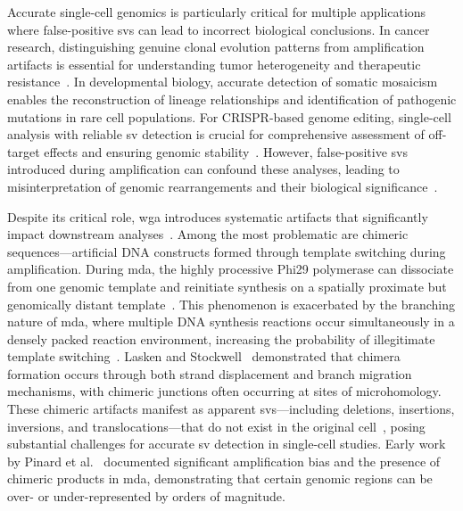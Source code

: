 \documentclass[pdflatex,sn-nature,lineno]{sn-jnl}%
\theoremstyle{thmstyleone}%
\theoremstyle{thmstyletwo}%
\theoremstyle{thmstylethree}%
\begin{document}
Accurate single-cell genomics is particularly critical for multiple applications where false-positive \glspl{sv} can lead to incorrect biological conclusions.
In cancer research, distinguishing genuine clonal evolution patterns from amplification artifacts is essential for understanding tumor heterogeneity and therapeutic resistance~\cite{navin2011tumour}.
In developmental biology, accurate detection of somatic mosaicism enables the reconstruction of lineage relationships and identification of pathogenic mutations in rare cell populations.
For CRISPR-based genome editing, single-cell analysis with reliable \gls{sv} detection is crucial for comprehensive assessment of off-target effects and ensuring genomic stability~\cite{gonzalez-pena2021accurate}.
However, false-positive \glspl{sv} introduced during amplification can confound these analyses, leading to misinterpretation of genomic rearrangements and their biological significance~\cite{macaulay2014single,lu2023chimera}.

Despite its critical role, \gls{wga} introduces systematic artifacts that significantly impact downstream analyses~\cite{lu2023chimera,lu2023exploration, pinard2006assessment,lasken2007mechanism,chen2017singlecell}.
Among the most problematic are chimeric sequences—artificial DNA constructs formed through template switching during amplification.
During \gls{mda}, the highly processive Phi29 polymerase can dissociate from one genomic template and reinitiate synthesis on a spatially proximate but genomically distant template~\cite{lasken2007mechanism,lu2023chimera}.
This phenomenon is exacerbated by the branching nature of \gls{mda}, where multiple DNA synthesis reactions occur simultaneously in a densely packed reaction environment, increasing the probability of illegitimate template switching~\cite{lasken2007mechanism}.
Lasken and Stockwell~\cite{lasken2007mechanism} demonstrated that chimera formation occurs through both strand displacement and branch migration mechanisms, with chimeric junctions often occurring at sites of microhomology.
These chimeric artifacts manifest as apparent \glspl{sv}—including deletions, insertions, inversions, and translocations—that do not exist in the original cell~\cite{lu2023chimera,agyabeng2025evaluating}, posing substantial challenges for accurate \gls{sv} detection in single-cell studies.
Early work by Pinard et al.~\cite{pinard2006assessment} documented significant amplification bias and the presence of chimeric products in \gls{mda}, demonstrating that certain genomic regions can be over- or under-represented by orders of magnitude.
\end{document}
